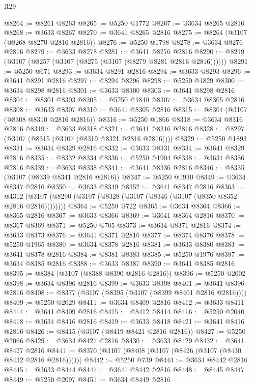 \begin{lexlean}{R29}
\begin{coremodule}
@8264 := @8261 @8263
@8265 := @5250 @1772
@8267 := @3634 @8265 @2816
@8268 := @3633 @8267
@8270 := @3641 @8265 @2816
@8275 := @8264 (@3107 (@8268 @8270 @2816 @2816))
@8276 := @5250 @1798
@8278 := @3634 @8276 @2816
@8279 := @3633 @8278
@8281 := @3641 @8276 @2816
@8290 := @8219 (@3107 (@8257 (@3107 (@8275 (@3107 (@8279 @8281 @2816 @2816))))))
@8291 := @5250 @671
@8293 := @3634 @8291 @2816
@8294 := @3633 @8293
@8296 := @3641 @8291 @2816
@8297 := @8294 @8296
@8298 := @5250 @1829
@8300 := @3634 @8298 @2816
@8301 := @3633 @8300
@8303 := @3641 @8298 @2816
@8304 := @8301 @8303
@8305 := @5250 @1840
@8307 := @3634 @8305 @2816
@8308 := @3633 @8307
@8310 := @3641 @8305 @2816
@8315 := @8304 (@3107 (@8308 @8310 @2816 @2816))
@8316 := @5250 @1866
@8318 := @3634 @8316 @2816
@8319 := @3633 @8318
@8321 := @3641 @8316 @2816
@8328 := @8297 (@3107 (@8315 (@3107 (@8319 @8321 @2816 @2816))))
@8329 := @5250 @1893
@8331 := @3634 @8329 @2816
@8332 := @3633 @8331
@8334 := @3641 @8329 @2816
@8335 := @8332 @8334
@8336 := @5250 @1904
@8338 := @3634 @8336 @2816
@8339 := @3633 @8338
@8341 := @3641 @8336 @2816
@8346 := @8335 (@3107 (@8339 @8341 @2816 @2816))
@8347 := @5250 @1930
@8349 := @3634 @8347 @2816
@8350 := @3633 @8349
@8352 := @3641 @8347 @2816
@8363 := @4312 (@3107 (@8290 (@3107 (@8328 (@3107 (@8346 (@3107 (@8350 @8352 @2816 @2816))))))))
@8364 := @5250 @722
@8365 := @3634 @8364
@8366 := @8365 @2816
@8367 := @3633 @8366
@8369 := @3641 @8364 @2816
@8370 := @8367 @8369
@8371 := @5250 @705
@8373 := @3634 @8371 @2816
@8374 := @3633 @8373
@8376 := @3641 @8371 @2816
@8377 := @8374 @8376
@8378 := @5250 @1965
@8380 := @3634 @8378 @2816
@8381 := @3633 @8380
@8383 := @3641 @8378 @2816
@8384 := @8381 @8383
@8385 := @5250 @1976
@8387 := @3634 @8385 @2816
@8388 := @3633 @8387
@8390 := @3641 @8385 @2816
@8395 := @8384 (@3107 (@8388 @8390 @2816 @2816))
@8396 := @5250 @2002
@8398 := @3634 @8396 @2816
@8399 := @3633 @8398
@8401 := @3641 @8396 @2816
@8408 := @8377 (@3107 (@8395 (@3107 (@8399 @8401 @2816 @2816))))
@8409 := @5250 @2029
@8411 := @3634 @8409 @2816
@8412 := @3633 @8411
@8414 := @3641 @8409 @2816
@8415 := @8412 @8414
@8416 := @5250 @2040
@8418 := @3634 @8416 @2816
@8419 := @3633 @8418
@8421 := @3641 @8416 @2816
@8426 := @8415 (@3107 (@8419 @8421 @2816 @2816))
@8427 := @5250 @2066
@8429 := @3634 @8427 @2816
@8430 := @3633 @8429
@8432 := @3641 @8427 @2816
@8441 := @8370 (@3107 (@8408 (@3107 (@8426 (@3107 (@8430 @8432 @2816 @2816))))))
@8442 := @5250 @739
@8444 := @3634 @8442 @2816
@8445 := @3633 @8444
@8447 := @3641 @8442 @2816
@8448 := @8445 @8447
@8449 := @5250 @2097
@8451 := @3634 @8449 @2816

\end{coremodule}
\end{lexlean}
